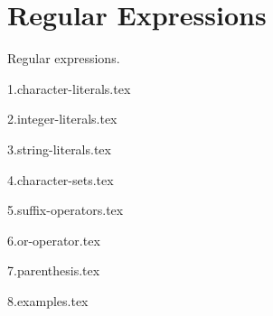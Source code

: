 
\section{Regular Expressions}
\label{sec:regex}
{
	Regular expressions.
	
	{1.character-literals.tex}
	
	{2.integer-literals.tex}
	
	{3.string-literals.tex}
	
	{4.character-sets.tex}
	
	{5.suffix-operators.tex}
	
	{6.or-operator.tex}
	
	{7.parenthesis.tex}
	
	{8.examples.tex}
}

